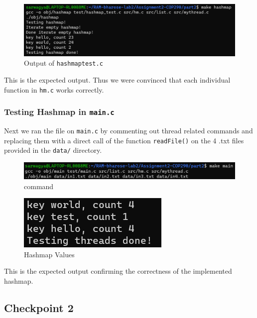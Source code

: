 \documentclass[notitlepage]{report}
\begin{document}
\begin{figure}[hbp]
    \centering
    \includegraphics[width = 1\linewidth]{hashmap_test_out.png}
    \caption*{Output of \texttt{hashmap\textunderscore test.c}}
\end{figure}

\noindent This is the expected output. Thus we were convinced that each individual function in \texttt{hm.c} works correctly. 
\newline
\newline
\subsubsection*{Testing Hashmap in \texttt{main.c}}
\noindent Next we ran the file on \texttt{main.c} by commenting out thread related commands and replacing them with a direct call of the function \texttt{readFile()} on the 4 .txt files provided in the \texttt{data/} directory.

\begin{figure}[hbp]
    \centering
    \includegraphics[width = 1\linewidth]{checkpoint1_command.png}
    \caption*{command}
\end{figure}

\begin{figure}[hbp]
    \centering
    \includegraphics[width = 0.35\linewidth]{checkpoint1_out.png}
    \caption*{Hashmap Values}
\end{figure}

\noindent This is the expected output confirming the correctness of the implemented hashmap.

\pagebreak
\subsection*{Checkpoint 2}
\end{document}
